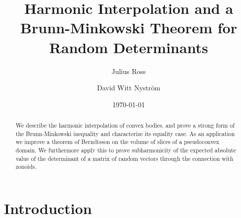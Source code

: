 \documentclass[reqno]{amsart}
\date{\today}
\theoremstyle{definition}
\theoremstyle{definition}
\theoremstyle{definition}
\begin{document}
\newcommand{\Pos}{Pos}
\renewcommand{\Im}{\operatorname{Im}}

\newcommand{\Hess}{\operatorname{Hess}}
\newcommand{\Id}{\operatorname{Id}}
\newcommand{\Sym}{\operatorname{Sym}}
\newcommand{\vol}{\operatorname{vol}}
\newcommand{\Hom}{\operatorname{Hom}}


\newcommand{\argmin}{\operatorname{argmin}}
\newcommand{\diag}{\operatorname{diag}}

\renewcommand{\Pos}{\operatorname{Pos}}
\newcommand{\calPos}{\mathcal P}
\newcommand{\Int}{\operatorname{Int}}
\setcounter{tocdepth}{1}

\begin{abstract}
We describe the harmonic interpolation of convex bodies, and prove a strong form of the Brunn-Minkowski inequality and characterize its equality case.  As an application we improve a theorem of Berndtsson on the volume of slices of a pseudoconvex domain.  We furthermore apply this to prove subharmonicity of the expected absolute value of the determinant of a matrix of random vectors through the connection with zonoids.
\end{abstract}


\title[Harmonic Interpolation, Zonoids, Random Determinants]{Harmonic Interpolation and a Brunn-Minkowski Theorem for Random Determinants}

\author{Julius  Ross}
\author{David Witt Nystr\"om}

\address{Mathematics Statistics and Computer Science, University of Illinois at Chicago, Chicago  IL, USA}

\address{Department of Mathematical Sciences, Chalmers University of Technology and the University of Gothenburg, Sweden}


\maketitle

\section{Introduction}
\end{document}
